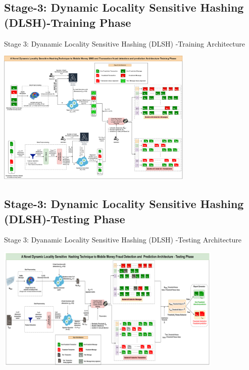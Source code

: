 \documentclass[11pt,aspectratio=169]{beamer}
\begin{document}
	
	
		\subsection{Stage-3: Dynamic Locality Sensitive Hashing (DLSH)-Training Phase}
		\begin{frame}{\small Stage 3: Dyanamic Locality Sensitive Hashing (DLSH) -Training Architecture}
		
			\begin{center}
				\includegraphics[width=\textwidth,height=183pt]{assets/training1.png}
			\end{center}
			
		\end{frame}
	
			\subsection{Stage-3: Dynamic Locality Sensitive Hashing (DLSH)-Testing Phase}
		\begin{frame}{ \small Stage 3: Dyanamic Locality Sensitive Hashing (DLSH) -Testing Architecture}
			\begin{center}
				\includegraphics[width=\textwidth,height=169pt]{assets/testing.png}
			\end{center}
			
		\end{frame}
	
\end{document}
